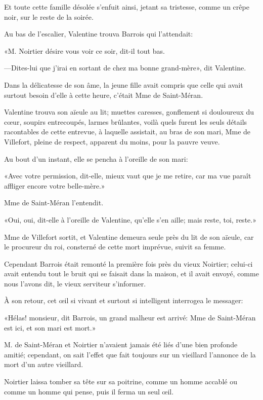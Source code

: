 Et toute cette famille désolée s'enfuit ainsi, jetant sa tristesse, comme un crêpe noir, sur le reste de la soirée. 

Au bas de l'escalier, Valentine trouva Barrois qui l'attendait: 

«M. Noirtier désire vous voir ce soir, dit-il tout bas. 

—Dites-lui que j'irai en sortant de chez ma bonne grand-mère», dit Valentine. 

Dans la délicatesse de son âme, la jeune fille avait compris que celle qui avait surtout besoin d'elle à cette heure, c'était Mme de Saint-Méran. 

Valentine trouva son aïeule au lit; muettes caresses, gonflement si douloureux du cœur, soupirs entrecoupés, larmes brûlantes, voilà quels furent les seuls détails racontables de cette entrevue, à laquelle assistait, au bras de son mari, Mme de Villefort, pleine de respect, apparent du moins, pour la pauvre veuve. 

Au bout d'un instant, elle se pencha à l'oreille de son mari: 

«Avec votre permission, dit-elle, mieux vaut que je me retire, car ma vue paraît affliger encore votre belle-mère.» 

Mme de Saint-Méran l'entendit. 

«Oui, oui, dit-elle à l'oreille de Valentine, qu'elle s'en aille; mais reste, toi, reste.» 

Mme de Villefort sortit, et Valentine demeura seule près du lit de son aïeule, car le procureur du roi, consterné de cette mort imprévue, suivit sa femme. 

Cependant Barrois était remonté la première fois près du vieux Noirtier; celui-ci avait entendu tout le bruit qui se faisait dans la maison, et il avait envoyé, comme nous l'avons dit, le vieux serviteur s'informer. 

À son retour, cet œil si vivant et surtout si intelligent interrogea le messager: 

«Hélas! monsieur, dit Barrois, un grand malheur est arrivé: Mme de Saint-Méran est ici, et son mari est mort.» 

M. de Saint-Méran et Noirtier n'avaient jamais été liés d'une bien profonde amitié; cependant, on sait l'effet que fait toujours sur un vieillard l'annonce de la mort d'un autre vieillard. 

Noirtier laissa tomber sa tête sur sa poitrine, comme un homme accablé ou comme un homme qui pense, puis il ferma un seul œil. 

